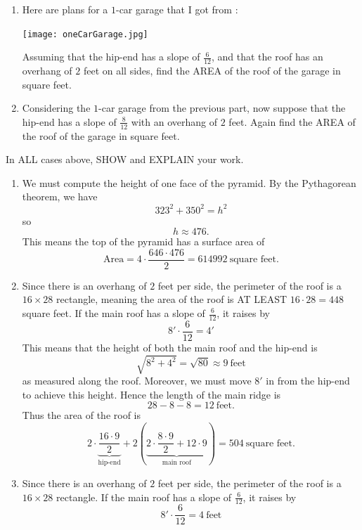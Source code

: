 \documentclass[hints,nooutcomes,noauthor,handout]{ximera}
\begin{document}
\begin{question}
\begin{enumerate}
\item Here are plans for a $1$-car garage that I got from :
   \begin{center}
     \texttt{[image: oneCarGarage.jpg]}
   \end{center}
   Assuming that the hip-end has a slope of $\frac{6}{12}$, and that
   the roof has an overhang of $2$ feet on all sides, find the AREA of
   the roof of the garage in square feet.
 \item Considering the $1$-car garage from the previous part, now
   suppose that the hip-end has a slope of $\frac{8}{12}$ with an
   overhang of $2$ feet. Again find the AREA of the roof of the
   garage in square feet.
\end{enumerate}
In ALL cases above, SHOW and EXPLAIN your work.
\begin{freeResponse}
  \begin{enumerate}
    \item We must compute the height of one face of the pyramid. By
      the Pythagorean theorem, we have
      \[
      323^2 + 350^2 = h^2
      \]
      so
      \[
      h \approx 476.
      \]
      This means the top of the pyramid has a surface area of
      \[
      \text{Area} = 4\cdot \frac{646\cdot 476}{2} = 614992~\text{square feet}.
      \]
    \item Since there is an overhang of $2$ feet per side, the
      perimeter of the roof is a $16\times 28$ rectangle, meaning the
      area of the roof is AT LEAST $16\cdot 28 = 448$ square feet. If
      the main roof has a slope of $\frac{6}{12}$, it raises by
      \[
      8'\cdot \frac{6}{12}  = 4'
      \]
      This means that the height of both the main roof and the hip-end is
      \[
      \sqrt{8^2+4^2} = \sqrt{80} \approx 9~\text{feet}
      \]
      as measured along the roof. Moreover, we must move $8'$ in from
      the hip-end to achieve this height. Hence the length of the main
      ridge is
      \[
      28-8-8 = 12~\text{feet}.
      \]
      Thus the area of the roof is
      \[
      2\cdot \underbrace{\frac{16\cdot 9}{2}}_{\text{hip-end}} +
      2\left(\underbrace{2\cdot \frac{8\cdot 9}{2} + 12\cdot
        9}_{\text{main roof}}\right) = 504~\text{square feet}.
      \]
    \item Since there is an overhang of $2$ feet per side, the
      perimeter of the roof is a $16\times 28$ rectangle. If the main
      roof has a slope of $\frac{6}{12}$, it raises by
      \[
      8'\cdot \frac{6}{12}  = 4~\text{feet}
\]
\end{enumerate}
\end{freeResponse}
\end{question}
\end{document}
